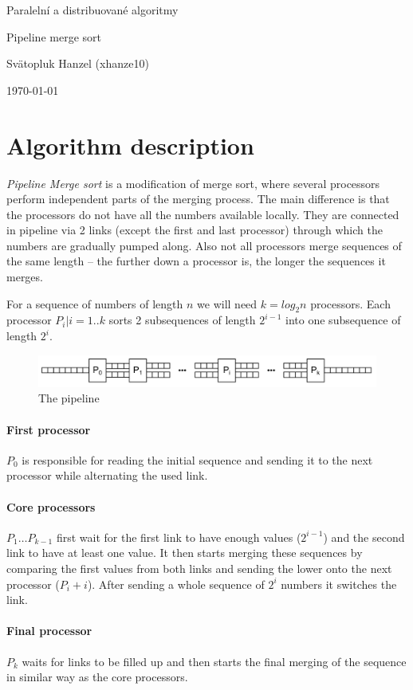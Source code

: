 \documentclass[11pt,a4paper,oneside]{article}
\begin{document}
\centerline{{\Large Paralelní a distribuované algoritmy}}
\centerline{\Huge{Pipeline merge sort}}
\bigskip
\centerline{\large Svätopluk Hanzel \tiny (xhanze10)}
\centerline{\small \today}


\section{Algorithm description}
	\textit{Pipeline Merge sort} is a modification of merge sort, where several processors perform independent parts of the merging process. The main difference is that the processors do not have all the numbers available locally. They are connected in pipeline via 2 links (except the first and last processor) through which the numbers are gradually pumped along. Also not all processors merge sequences of the same length -- the further down a processor is, the longer the sequences it merges. \cite{akl2014parallel}
	
	For a sequence of numbers of length $n$ we will need $k = log_2 n$ processors. Each processor $P_i | i = 1..k$ sorts 2 subsequences of length $2^{i-1}$ into one subsequence of length $2^i$.
	
	\begin{figure}[h]
		\centering
		\includegraphics[width=0.7\linewidth]{img/pipeline.jpg}
		\caption{The pipeline}
		\label{fig:pipeline}
	\end{figure}

	\paragraph{First processor} $P_0$ is responsible for reading the initial sequence and sending it to the next processor while alternating the used link.
	\paragraph{Core processors} $P_1 \dots P_{k-1}$ first wait for the first link to have enough values ($2^{i-1}$) and the second link to have at least one value. It then starts merging these sequences by comparing the first values from both links and sending the lower onto the next processor ($P_i+i$). After sending a whole sequence of $2^i$ numbers it switches the link.
	\paragraph{Final processor} $P_k$ waits for links to be filled up and then starts the final merging of the sequence in similar way as the core processors.
	
\end{document}
